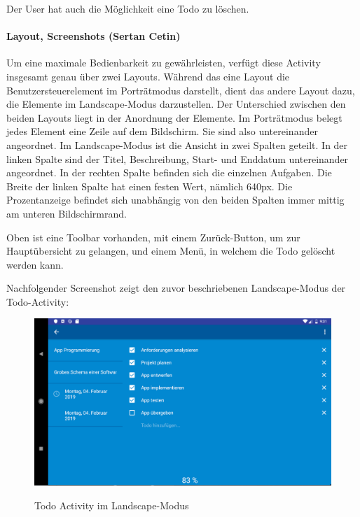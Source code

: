 Der User hat auch die Möglichkeit eine Todo zu löschen.

\paragraph{Layout, Screenshots (Sertan Cetin)}
Um eine maximale Bedienbarkeit zu gewährleisten, verfügt diese Activity insgesamt genau über zwei Layouts. Während das eine Layout die Benutzersteuerelement im Porträtmodus darstellt, dient das andere Layout dazu, die Elemente im Landscape-Modus darzustellen. Der Unterschied zwischen den beiden Layouts liegt in der Anordnung der Elemente. Im Porträtmodus belegt jedes Element eine Zeile auf dem Bildschirm. Sie sind also untereinander angeordnet. Im Landscape-Modus ist die Ansicht in zwei Spalten geteilt. In der linken Spalte sind der Titel, Beschreibung, Start- und Enddatum untereinander angeordnet. In der rechten Spalte befinden sich die einzelnen Aufgaben. Die Breite der linken Spalte hat einen festen Wert, nämlich 640px. Die Prozentanzeige befindet sich unabhängig von den beiden Spalten immer mittig am unteren Bildschirmrand.

Oben ist eine Toolbar vorhanden, mit einem Zurück-Button, um zur Hauptübersicht zu gelangen, und einem Menü, in welchem die Todo gelöscht werden kann.

Nachfolgender Screenshot zeigt den zuvor beschriebenen Landscape-Modus der Todo-Activity: 

\begin{figure}[H]
\centering
\begin{minipage}[t]{1\textwidth} %
\caption{Todo Activity im Landscape-Modus} %
\includegraphics[width=1\textwidth]{img/Todo_landscape}\\ %
\end{minipage}
\end{figure}


